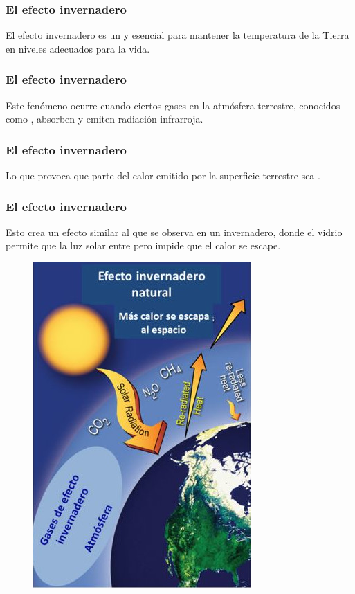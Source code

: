 \documentclass[14pt]{beamer}
\begin{document}
\begin{frame}
\frametitle{El efecto invernadero}
El efecto invernadero es un  y esencial para mantener la temperatura de la Tierra en niveles adecuados para la vida.
\end{frame}
\begin{frame}
\frametitle{El efecto invernadero}
Este fenómeno ocurre cuando ciertos gases en la atmósfera terrestre, conocidos como , absorben y emiten radiación infrarroja.
\end{frame}
\begin{frame}
\frametitle{El efecto invernadero}
Lo que provoca que parte del calor emitido por la superficie terrestre sea .
\end{frame}
\begin{frame}
\frametitle{El efecto invernadero}
Esto crea un efecto similar al que se observa en un invernadero, \pause donde el vidrio permite que la luz solar entre pero impide que el calor se escape.
\end{frame}
\begin{frame}
\vspace*{-0.5cm}
\begin{figure}
    \centering
    \includegraphics[scale=0.6]{Imagenes/Efecto_Invernadero_02.jpg}
\end{figure}
\end{frame}
\end{document}
